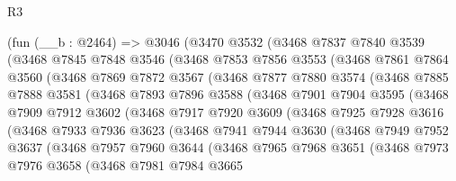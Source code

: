 \begin{lexlean}{R3}
\begin{coremodule}
    (fun (__b : @2464) =>
    @3046
      (@3470
        @3532
        (@3468
          @7837
          @7840
          @3539
          (@3468
            @7845
            @7848
            @3546
            (@3468
              @7853
              @7856
              @3553
              (@3468
                @7861
                @7864
                @3560
                (@3468
                  @7869
                  @7872
                  @3567
                  (@3468
                    @7877
                    @7880
                    @3574
                    (@3468
                      @7885
                      @7888
                      @3581
                      (@3468
                        @7893
                        @7896
                        @3588
                        (@3468
                          @7901
                          @7904
                          @3595
                          (@3468
                            @7909
                            @7912
                            @3602
                            (@3468
                              @7917
                              @7920
                              @3609
                              (@3468
                                @7925
                                @7928
                                @3616
                                (@3468
                                  @7933
                                  @7936
                                  @3623
                                  (@3468
                                    @7941
                                    @7944
                                    @3630
                                    (@3468
                                      @7949
                                      @7952
                                      @3637
                                      (@3468
                                        @7957
                                        @7960
                                        @3644
                                        (@3468
                                          @7965
                                          @7968
                                          @3651
                                          (@3468
                                            @7973
                                            @7976
                                            @3658
                                            (@3468
                                              @7981
                                              @7984
                                              @3665

\end{coremodule}
\end{lexlean}
